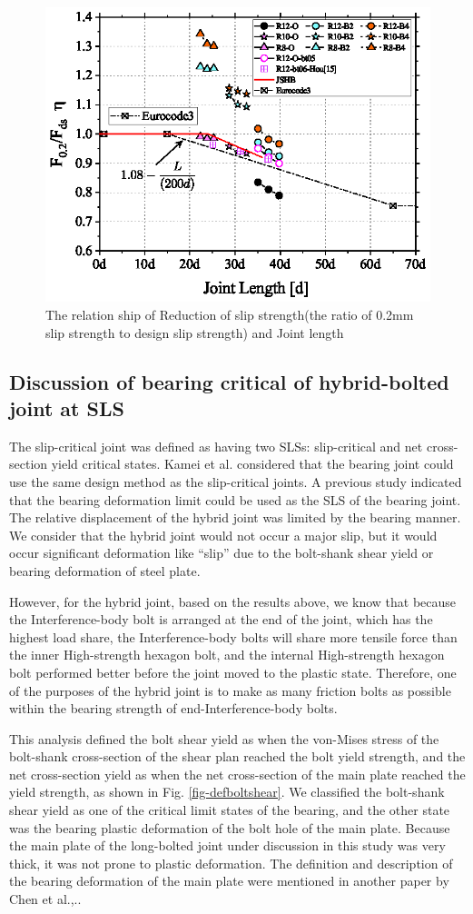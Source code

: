 \begin{figure}[htbp]
    \centering
    \includegraphics[width=0.6\linewidth]{imgs/ch5/F02-Fds-L-eq-new.eps}
    \caption{The relation ship of Reduction of slip strength(the ratio of 0.2mm slip strength to design slip strength) and Joint length}
    \label{fig-fdsredu}
\end{figure}

\subsection{Discussion of bearing critical of hybrid-bolted joint at SLS}

The slip-critical joint was defined as having two SLSs: slip-critical and net cross-section yield critical states. Kamei et al. \cite{kamei2010} considered that the bearing joint could use the same design method as the slip-critical joints. A previous study indicated that the bearing deformation limit could be used \cite{Rex2003,TODA2014} as the SLS of the bearing joint. The relative displacement of the hybrid joint was limited by the bearing manner. We consider that the hybrid joint would not occur a major slip, but it would occur significant deformation like ``slip'' due to the bolt-shank shear yield or bearing deformation of steel plate.

However, for the hybrid joint, based on the results above, we know that because the Interference-body bolt is arranged at the end of the joint, which has the highest load share, the Interference-body bolts will share more tensile force than the inner High-strength hexagon bolt, and the internal High-strength hexagon bolt performed better before the joint moved to the plastic state. Therefore, one of the purposes of the hybrid joint is to make as many friction bolts as possible within the bearing strength of end-Interference-body bolts.

This analysis defined the bolt shear yield as when the von-Mises stress of the bolt-shank cross-section of the shear plan reached the bolt yield strength, and the net cross-section yield as when the net cross-section of the main plate reached the yield strength, as shown in Fig. \ref{fig-defboltshear}. We classified the bolt-shank shear yield as one of the critical limit states of the bearing, and the other state was the bearing plastic deformation of the bolt hole of the main plate. Because the main plate of the long-bolted joint under discussion in this study was very thick, it was not prone to plastic deformation. The definition and description of the bearing deformation of the main plate were mentioned in another paper by Chen et al.,.\cite{chen2022jp}.


